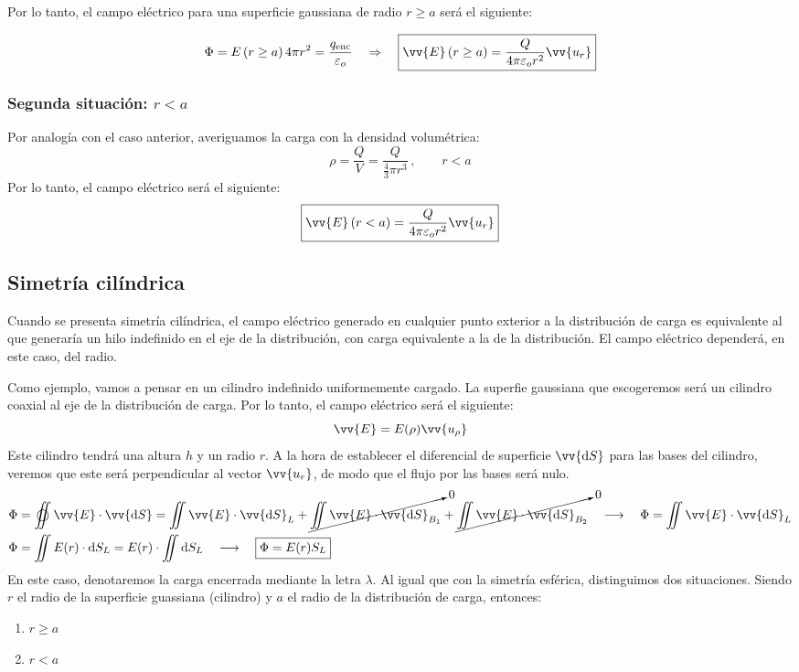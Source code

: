 \documentclass[a4paper]{book}
\numberwithin{figure}{chapter}
\numberwithin{equation}{chapter}
\newcommand{\subtext}[1]{_{\text{#1}}}
\renewcommand{\vec}[1]{\vv{{#1}}}
\begin{document}
Por lo tanto, el campo eléctrico para una superficie gaussiana de radio $r\geq a$ será el siguiente:

\[\Phi = E\left( r\geq a \right)4\pi r^2 =\frac{q\subtext{enc}}{\varepsilon_o} \quad \Rightarrow \quad \boxed{\vec{E}\left( r\geq a \right) = \frac{Q}{4\pi \varepsilon_o r^2}\vec{u_r}}\]


\subsubsection{Segunda situación: $r<a$}
Por analogía con el caso anterior, averiguamos la carga con la densidad volumétrica:
\[\rho = \frac{Q}{V} = \frac{Q}{\frac{4}{3}\pi r^3} \, , \qquad r<a\]
Por lo tanto, el campo eléctrico será el siguiente:
\[\boxed{\vec{E}\left( r<a \right) = \frac{Q}{4\pi \varepsilon_o r^2}\vec{u_r}}\]


\subsection{Simetría cilíndrica}
Cuando se presenta simetría cilíndrica, el campo eléctrico generado en cualquier punto exterior a la distribución de carga es equivalente al que generaría un hilo indefinido en el eje de la distribución, con carga equivalente a la de la distribución. El campo eléctrico dependerá, en este caso, del radio.

Como ejemplo, vamos a pensar en un cilindro indefinido uniformemente cargado. La superfie gaussiana que escogeremos será un cilindro coaxial al eje de la distribución de carga. Por lo tanto, el campo eléctrico será el siguiente:
\[\vec{E}=E(\rho)\vec{u_\rho}\]
Este cilindro tendrá una altura $h$ y un radio $r$. A la hora de establecer el diferencial de superficie $\vec{\dd S}$ para las bases del cilindro, veremos que este será perpendicular al vector $\vec{u_r}$, de modo que el flujo por las bases será nulo.
\begin{align*}
	\Phi & = \varoiint \vec{E}\cdot \vec{\dd S} = \iint \vec{E}\cdot \vec{\dd S}_L + \cancelto{0}{\iint \vec{E}\cdot \vec{\dd S}_{B_1}} + \cancelto{0}{\iint \vec{E}\cdot \vec{\dd S}_{B_2}} \quad \longrightarrow \quad \Phi = \iint \vec{E}\cdot \vec{\dd S}_L \\
	\Phi & = \iint E(r)\cdot \dd S_L = E(r) \cdot \iint \dd S_L \quad \longrightarrow \quad \boxed{\Phi = E(r) S_L}
\end{align*}
En este caso, denotaremos la carga encerrada mediante la letra $\lambda$. Al igual que con la simetría esférica, distinguimos dos situaciones. Siendo $r$ el radio de la superficie guassiana (cilindro) y $a$ el radio de la distribución de carga, entonces:
\begin{enumerate}
	\item $r\geq a$
	\item $r<a$
\end{enumerate}
\end{document}
